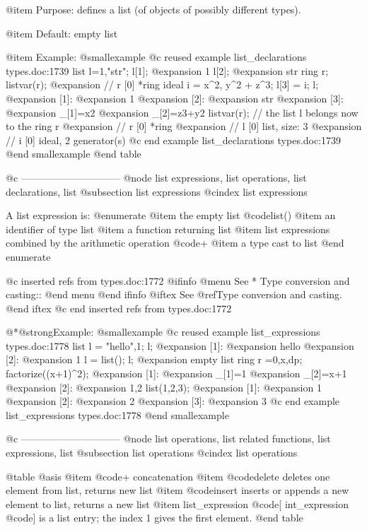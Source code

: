{{{{{{@item Purpose:
defines a list (of objects of possibly different types).

@item Default:
empty list

@item Example:
@smallexample
@c reused example list_declarations types.doc:1739 
  list l=1,"str";
  l[1];
@expansion{} 1
  l[2];
@expansion{} str
  ring r;
  listvar(r);
@expansion{} // r                    [0]  *ring
  ideal i = x^2, y^2 + z^3;
  l[3] = i;
  l;
@expansion{} [1]:
@expansion{}    1
@expansion{} [2]:
@expansion{}    str
@expansion{} [3]:
@expansion{}    _[1]=x2
@expansion{}    _[2]=z3+y2
  listvar(r);     // the list l belongs now to the ring r
@expansion{} // r                    [0]  *ring
@expansion{} // l                    [0]  list, size: 3
@expansion{} // i                    [0]  ideal, 2 generator(s)
@c end example list_declarations types.doc:1739
@end smallexample
@end table

@c ------------------------------
@node list expressions, list operations, list declarations, list
@subsection list expressions
@cindex list expressions

A list expression is:
@enumerate
@item
the empty list @code{list()}
@item
an identifier of type list
@item
a function returning list
@item
list expressions combined by the arithmetic operation @code{+}
@item
a type cast to list
@end enumerate

@c inserted refs from types.doc:1772
@ifinfo
@menu
See 
* Type conversion and casting::
@end menu
@end ifinfo
@iftex
See 
@ref{Type conversion and casting}.
@end iftex
@c end inserted refs from types.doc:1772

@*@strong{Example:}
@smallexample
@c reused example list_expressions types.doc:1778 
  list l = "hello",1;
  l;
@expansion{} [1]:
@expansion{}    hello
@expansion{} [2]:
@expansion{}    1
  l = list();
  l;
@expansion{} empty list
  ring r =0,x,dp;
  factorize((x+1)^2);
@expansion{} [1]:
@expansion{}    _[1]=1
@expansion{}    _[2]=x+1
@expansion{} [2]:
@expansion{}    1,2
  list(1,2,3);
@expansion{} [1]:
@expansion{}    1
@expansion{} [2]:
@expansion{}    2
@expansion{} [3]:
@expansion{}    3
@c end example list_expressions types.doc:1778
@end smallexample

@c ------------------------------
@node list operations, list related functions, list expressions, list
@subsection list operations
@cindex list operations

@table @asis
@item @code{+}
concatenation
@item @code{delete}
deletes one element from list, returns new list
@item @code{insert}
inserts or appends a new element to list, returns a new list
@item list_expression @code{[} int_expression @code{]}
is a list entry; the index 1 gives the first element.
@end table

}}}}}}
